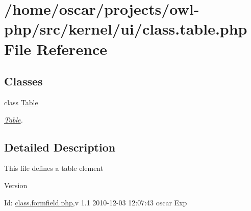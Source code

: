 \section{/home/oscar/projects/owl-\/php/src/kernel/ui/class.table.php File Reference}
\label{class_8table_8php}
\subsection*{Classes}
\begin{DoxyCompactItemize}
\item 
class \hyperlink{classTable}{Table}
\begin{DoxyCompactList}\small\item\em \hyperlink{classTable}{Table}. \item\end{DoxyCompactList}\end{DoxyCompactItemize}


\subsection{Detailed Description}
This file defines a table element \begin{DoxyVersion}{Version}

\end{DoxyVersion}
\begin{DoxyParagraph}{Id:}
\hyperlink{class_8formfield_8php}{class.formfield.php},v 1.1 2010-\/12-\/03 12:07:43 oscar Exp 
\end{DoxyParagraph}
